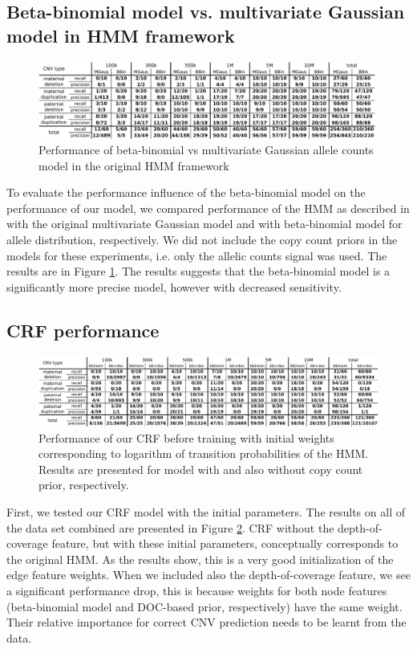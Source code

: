 \subsection{Beta-binomial model vs. multivariate Gaussian model in HMM framework}
\begin{figure}
\caption{Performance of beta-binomial vs multivariate Gaussian allele counts model in the original HMM framework}
\label{fig:BBvsMG}
\centering
\includegraphics[width=0.99\textwidth]{figures/hmm_bb_mg}
\end{figure}
To evaluate the performance influence of the beta-binomial model on the performance of our model, we compared performance of the HMM as described in \cite{rampasek2014fcnv} with the original multivariate Gaussian model and with beta-binomial model for allele distribution, respectively. We did not include the copy count priors in the models for these experiments, i.e. only the allelic counts signal was used. The results are in Figure \ref{fig:BBvsMG}. The results suggests that the beta-binomial model is a significantly more precise model, however with decreased sensitivity.

\subsection{CRF performance}
\begin{figure}
\caption{Performance of our CRF before training with initial weights corresponding to logarithm of transition probabilities of the HMM. Results are presented for model with and also without copy count prior, respectively.}
\label{fig:CRFinit}
\centering
\hspace*{-8pt}
\includegraphics[width=1.03\textwidth]{figures/crf_initial_all}
\end{figure}
First, we tested our CRF model with the initial parameters. The results on all of the data set combined are presented in Figure \ref{fig:CRFinit}. CRF without the depth-of-coverage feature, but with these initial parameters, conceptually corresponds to the original HMM. As the results show, this is a very good initialization of the edge feature weights. When we included also the depth-of-coverage feature, we see a significant performance drop, this is because weights for both node features (beta-binomial model and DOC-based prior, respectively) have the same weight. Their relative importance for correct CNV prediction needs to be learnt from the data.


